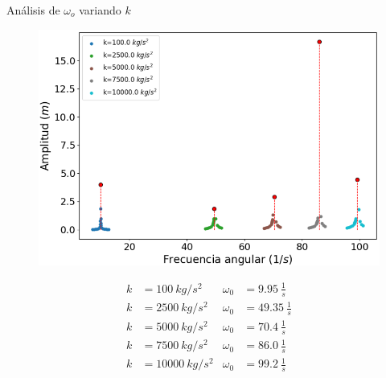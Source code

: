\begin{frame}{Análisis de $\omega_o$ variando $k$}
    \begin{minipage}[c]{0.6\linewidth}
        \begin{figure}[H]
            \centering
            \includegraphics[width=1\textwidth]{pic/05-results/amp_w_k}
            \label{fig:amp_w_k}
        \end{figure}
    \end{minipage}
    \begin{minipage}[c]{0.39\linewidth}
        \footnotesize{
            \begin{equation*}
                \begin{aligned}
                    k&=100\ kg/s^2 & \omega_0 &= 9.95\ \frac{1}{s} \\
                    k&=2500\ kg/s^2 & \omega_0 &= 49.35\ \frac{1}{s} \\
                    k&=5000\ kg/s^2 & \omega_0 &= 70.4\ \frac{1}{s} \\
                    k&=7500\ kg/s^2 & \omega_0 &= 86.0\ \frac{1}{s} \\
                    k&=10000\ kg/s^2 & \omega_0 &= 99.2\ \frac{1}{s}
                \end{aligned}
            \end{equation*}
        }
    \end{minipage}
\end{frame}

